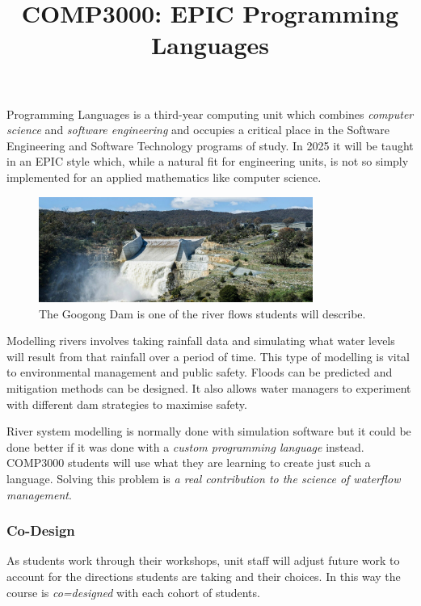 \documentclass[twoside=false,DIV=14]{scrartcl}
\title{\color{redish} \vspace{-1em}COMP3000: EPIC Programming Languages}
\begin{document}
{\color{blackish}\maketitle}\vspace{-7em}

\begin{abstract}
\end{abstract}
    Programming Languages is a third-year computing unit which combines \emph{computer science} and \emph{software engineering} and occupies a critical place in the Software Engineering and Software Technology programs of study.  In 2025 it will be taught in an EPIC style which, while a natural fit for engineering units, is not so simply implemented for an applied mathematics like computer science.  


\begin{figure}[h]
    \begin{center}
      \includegraphics[width=0.8\textwidth]{googong.jpg}
    \end{center}
    \caption{The Googong Dam is one of the river flows students will describe.}
  \end{figure}
  
Modelling rivers involves taking rainfall data and simulating what water levels will result from that rainfall over a period of time.  This type of modelling is vital to environmental management and public safety. Floods can be predicted and mitigation methods can be designed.  It also allows water managers to experiment with different dam strategies to maximise safety.

River system modelling is normally done with simulation software but it could be done better if it was done with a \emph{custom programming language} instead.  COMP3000 students will use what they are learning to create just such a language.  Solving this problem is \emph{a real contribution to the science of waterflow management}.

\subsubsection*{Co-Design}
As students work through their workshops, unit staff will adjust future work to account for the directions students are taking and their choices.  In this way the course is \emph{co=designed} with each cohort of students.
  
\end{document}
